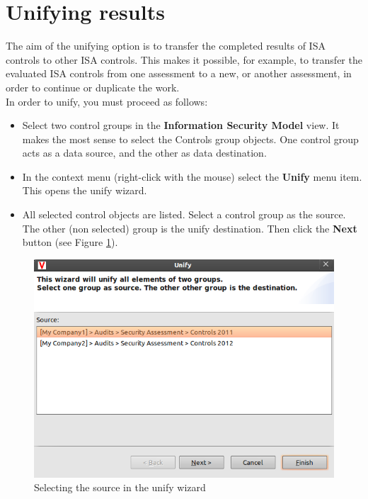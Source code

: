\documentclass[a4paper,10pt]{book}
\begin{document}
\section{Unifying results}
The aim of the unifying option is to transfer the completed results of ISA controls to other ISA controls.
This makes it possible, for example, to transfer the evaluated ISA controls from one assessment to a new, or
another assessment, in order to continue or duplicate the work.
\newline\\
In order to unify, you must proceed as follows:
\begin{itemize}
 \item Select two control groups in the \textbf{Information Security Model} view. It makes the most sense to select
  the Controls group objects. One control group acts as a data source, and the other as data destination.
  \item In the context menu (right-click with the mouse) select the \textbf{Unify} menu item. This opens the unify wizard.
  \item All selected control objects are listed. Select a control group as the source. The other (non selected) group is
  the unify destination. Then click the \textbf{Next} button (see Figure \ref{Selecting the source in the unify wizard}).
\end{itemize}
\begin{figure}[htb!]
  \centering
  \includegraphics[scale=.6]{Screenshot/Isa_konsolidator_1-en.png}
  \caption{\label{Selecting the source in the unify wizard} Selecting the source in the unify wizard}
\end{figure}
\end{document}
